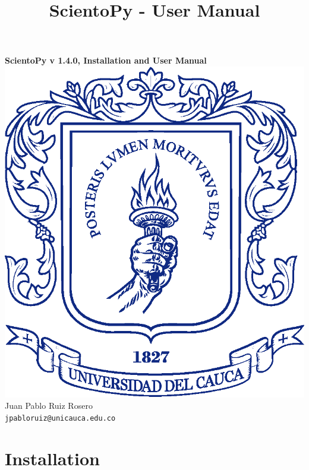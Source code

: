 \documentclass[10pt,letterpaper]{article}
\title{ScientoPy - User Manual}
\begin{document}
\begin{center}
{\LARGE \textbf{ScientoPy v 1.4.0, Installation and User Manual\\}}
\vspace*{0.5cm}
\includegraphics[scale=0.2]{./figures/escudoUnicacuaSolo.eps}\\
\vspace*{0.5cm}
Juan Pablo Ruiz Rosero\\
\texttt{jpabloruiz@unicauca.edu.co} \\
\end{center}

\tableofcontents

\newpage

\section{Installation}
\end{document}
